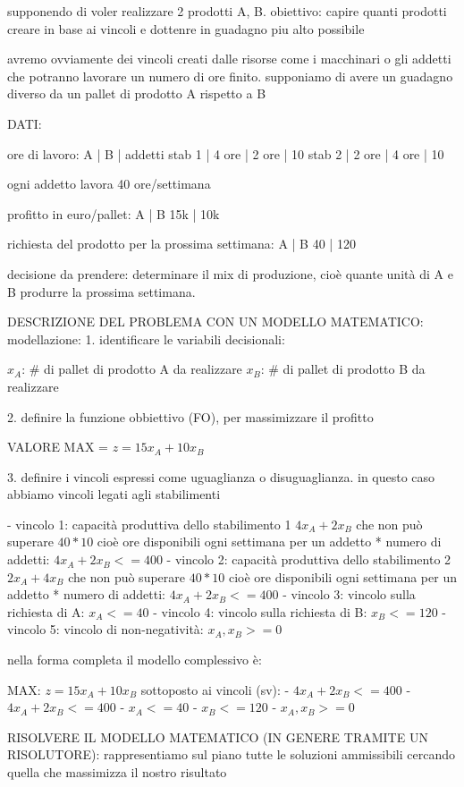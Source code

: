 supponendo di voler realizzare 2 prodotti A, B. obiettivo: capire quanti prodotti creare in base ai vincoli e dottenre in guadagno piu alto possibile

avremo ovviamente dei vincoli creati dalle risorse come i macchinari o gli addetti che potranno lavorare un numero di ore finito. supponiamo di avere un guadagno diverso da un pallet di prodotto A rispetto a B


DATI:

ore di lavoro:
		  A		|	B		| addetti
stab 1 | 4 ore	|	2 ore	| 10
stab 2 | 2 ore	|	4 ore	| 10

ogni addetto lavora 40 ore/settimana


profitto in euro/pallet:
A	| B
15k	| 10k

richiesta del prodotto per la prossima settimana:
A	| B
40	| 120


decisione da prendere: determinare il mix di produzione, cioè quante unità di A e B produrre la prossima settimana.

DESCRIZIONE DEL PROBLEMA CON UN MODELLO MATEMATICO:
modellazione:
1. identificare le variabili decisionali:

$x_A$: \# di pallet di prodotto A da realizzare
$x_B$: \# di pallet di prodotto B da realizzare

2. definire la funzione obbiettivo (FO), per massimizzare il profitto

VALORE MAX = $z=15x_A+10x_B$

3. definire i vincoli espressi come uguaglianza o disuguaglianza. in questo caso abbiamo vincoli legati agli stabilimenti

	- vincolo 1: capacità produttiva dello stabilimento 1 $4x_A+2x_B$ che non può superare $40*10$ cioè ore disponibili ogni settimana per un addetto * numero di addetti:
		$4x_A+2x_B <= 400$
	- vincolo 2: capacità produttiva dello stabilimento 2 $2x_A+4x_B$ che non può superare $40*10$ cioè ore disponibili ogni settimana per un addetto * numero di addetti:
		$4x_A+2x_B <= 400$
	- vincolo 3: vincolo sulla richiesta di A: $x_A <= 40$
	- vincolo 4: vincolo sulla richiesta di B: $x_B <= 120$
	- vincolo 5: vincolo di non-negatività: $x_A, x_B >= 0$
	
nella forma completa il modello complessivo è:

MAX: $z=15x_A+10x_B$
sottoposto ai vincoli (sv):
- $4x_A+2x_B <= 400$
- $4x_A+2x_B <= 400$
- $x_A <= 40$
- $x_B <= 120$
- $x_A, x_B >= 0$


RISOLVERE IL MODELLO MATEMATICO (IN GENERE TRAMITE UN RISOLUTORE):
rappresentiamo sul piano tutte le soluzioni ammissibili cercando quella che massimizza il nostro risultato

